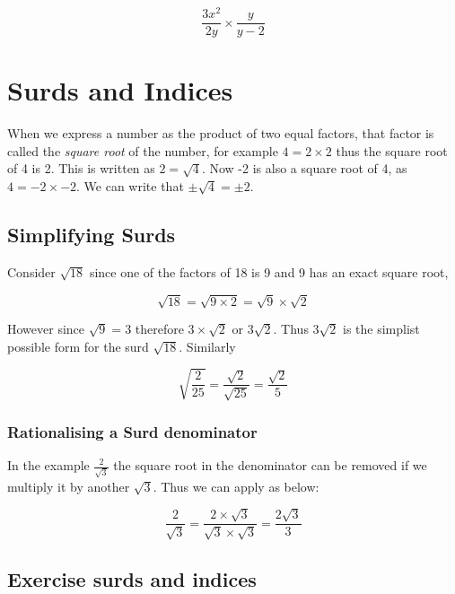 \begin{equation}
  \frac{3x^{2}}{2y} \times \frac{y}{y-2}
\end{equation}

\section{Surds and Indices}

When we express a number as the product of two equal factors, that factor is called the \textit{square root} of the number, for example $ 4 = 2 \times 2 $ thus the square root of 4 is 2. This is written as $ 2 = \sqrt{4} $. Now -2 is also a square root of 4, as $ 4 = -2 \times -2 $. We can write that $ \pm \sqrt{4} = \pm 2 $. 

\subsection{Simplifying Surds}

Consider $ \sqrt{18} $ since one of the factors of 18 is 9 and 9 has an exact square root, 

\begin{equation}
 \sqrt{18} = \sqrt{9 \times 2} = \sqrt{9} \times \sqrt{2} 
\end{equation}

However since $ \sqrt{9} = 3 $ therefore $ 3 \times \sqrt{2} $ or $ 3\sqrt{2} $. Thus $ 3\sqrt{2} $ is the simplist possible form for the surd $ \sqrt{18} $. Similarly

\begin{equation}
 \sqrt{\frac{2}{25}} = \frac{\sqrt{2}}{\sqrt{25}} = \frac{\sqrt{2}}{5} 
\end{equation}

\subsubsection{Rationalising a Surd denominator}

In the example $ \frac{2}{\sqrt{3}} $ the square root in the denominator can be removed if we multiply it by another $ \sqrt{3} $.  Thus we can apply as below:

\begin{equation}
 \frac{2}{\sqrt{3}} = \frac{2 \times \sqrt{3}}{\sqrt{3} \times \sqrt{3}} = \frac{2\sqrt{3}}{3}
\end{equation}


\subsection{Exercise surds and indices}

